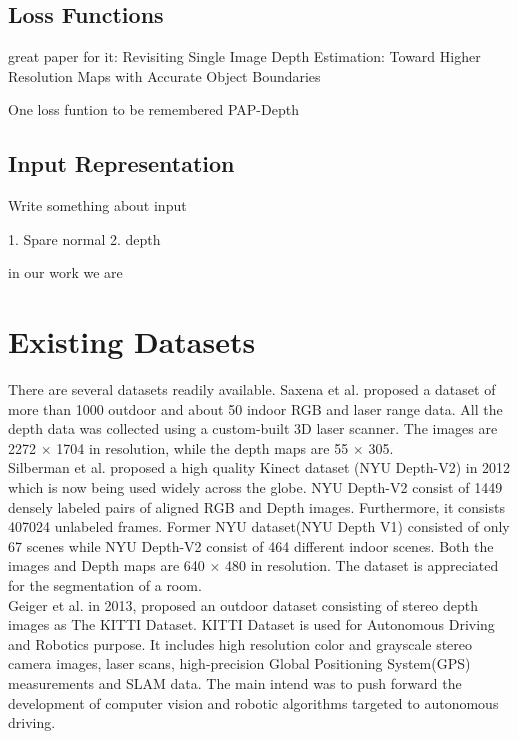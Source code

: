 \subsection{Loss Functions }
great paper for it: Revisiting Single Image Depth Estimation:
Toward Higher Resolution Maps with Accurate Object Boundaries \cite{hu2019revisiting}

One loss funtion to be remembered PAP-Depth \cite{PAP-Depth}




\subsection{Input Representation}
Write something about input

1. Spare normal 
2. depth

in our work we are 

\section{Existing Datasets}
There are several datasets readily available. Saxena et al. \cite{saxena2006learning} proposed a dataset of more than 1000 outdoor and about 50 indoor RGB and laser range data. All the depth data was collected using a custom-built 3D laser scanner. The images are 2272 $\times$ 1704 in resolution, while the depth maps are 55 $\times$ 305.\\

Silberman et al. \cite{Silberman:ECCV12} proposed a high quality Kinect dataset (NYU Depth-V2) in 2012 which is now being used widely across the globe. NYU Depth-V2 \cite{Silberman:ECCV12} consist of 1449 densely labeled pairs of aligned RGB and Depth images. Furthermore, it consists 407024 unlabeled frames. Former NYU dataset(NYU Depth V1) \cite{silberman11indoor} consisted of only 67 scenes while NYU Depth-V2 consist of 464 different indoor scenes. Both the images and Depth maps are 640 $\times$ 480 in resolution. The dataset is appreciated for the segmentation of a room.\\

Geiger et al. \cite{Geiger2013IJRR} in 2013, proposed an outdoor dataset consisting of stereo depth images as The KITTI Dataset. KITTI Dataset is used for Autonomous Driving and Robotics purpose. It includes high resolution color and grayscale stereo camera images, laser scans, high-precision Global Positioning System(GPS) measurements and SLAM data. The main intend was to push forward the development of computer vision and robotic algorithms targeted to autonomous driving.\\

